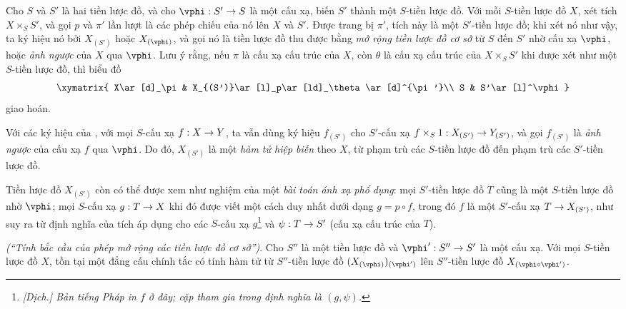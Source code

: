\documentclass[oneside]{amsart}
\makeatletter
\newcommand{\ega@arrow}[2]{\mathchoice{#1}{#2}{#2}{#2}}
\renewcommand{\to}{\ega@arrow{\longrightarrow}{\rightarrow}}
\let\EGAOriginalLabel\label
\renewcommand{\label}[1]{\phantomsection\EGAOriginalLabel{#1}}
\makeatother
\begin{document}
\begin{env}[3.3.6]
\label{I.3.3.6}
Cho $S$ và $S'$ là hai tiền lược đồ, và cho $\vphi:S'\to S$ là một cấu xạ,
biến $S'$ thành một $S$-tiền lược đồ. Với mỗi $S$-tiền lược đồ $X$, xét tích
$X\times_S S'$, và gọi $p$ và $\pi'$ lần lượt là các phép chiếu của nó lên $X$
và $S'$. Được trang bị $\pi'$, tích này là một $S'$-tiền lược đồ; khi xét nó
như vậy, ta ký hiệu nó bởi $X_{(S')}$ hoặc $X_{(\vphi)}$, và gọi nó là tiền
lược đồ thu được bằng \emph{mở rộng tiền lược đồ cơ sở} từ $S$ đến $S'$ nhờ
cấu xạ $\vphi$, hoặc \emph{ảnh ngược} của $X$ qua $\vphi$. Lưu ý rằng, nếu
$\pi$ là cấu xạ cấu trúc của $X$, còn $\theta$ là cấu xạ cấu trúc của
$X\times_S S'$ khi được xét như một $S$-tiền lược đồ, thì biểu đồ
\[
  \xymatrix{
    X\ar[d]_\pi &
    X_{(S')}\ar[l]_p\ar[ld]_\theta\ar[d]^{\pi'}\\
    S &
    S'\ar[l]^\vphi
  }
\]
giao hoán.
\end{env}

\begin{env}[3.3.7]
\label{I.3.3.7}
Với các ký hiệu của , với mọi $S$-cấu xạ $f:X\to Y$, ta vẫn
dùng ký hiệu $f_{(S')}$ cho $S'$-cấu xạ
$f\times_S 1:X_{(S')}\to Y_{(S')}$, và gọi
$f_{(S')}$ là \emph{ảnh ngược} của cấu xạ $f$ qua $\vphi$. Do đó,
$X_{(S')}$ là một \emph{hàm tử hiệp biến} theo $X$, từ phạm trù các
$S$-tiền lược đồ đến phạm trù các $S'$-tiền lược đồ.
\end{env}

\begin{env}[3.3.8]
\label{I.3.3.8}
Tiền lược đồ $X_{(S')}$ còn có thể được xem như nghiệm của một
\emph{bài toán ánh xạ phổ dụng}: mọi $S'$-tiền lược đồ $T$ cũng là một
$S$-tiền lược đồ nhờ $\vphi$; mọi $S$-cấu xạ $g:T\to X$ khi đó được viết một
cách duy nhất dưới dạng $g=p\circ f$, trong đó $f$ là một $S'$-cấu xạ
$T\to X_{(S')}$, như suy ra từ định nghĩa của tích áp dụng cho các $S$-cấu xạ
$g$\footnote{\emph{[Dịch.] Bản tiếng Pháp in $f$ ở đây; cặp tham gia trong
định nghĩa là $(g,\psi)$.}} và $\psi:T\to S'$ (cấu xạ cấu trúc của $T$).
\end{env}

\begin{proposition}[3.3.9]
\label{I.3.3.9}
\emph{(``Tính bắc cầu của phép mở rộng các tiền lược đồ cơ sở'')}. Cho $S''$
là một tiền lược đồ và $\vphi':S''\to S'$ là một cấu xạ. Với mọi
$S$-tiền lược đồ $X$, tồn tại một đẳng cấu chính tắc có tính hàm tử từ
$S''$-tiền lược đồ $(X_{(\vphi)})_{(\vphi')}$ lên $S''$-tiền lược đồ
$X_{(\vphi\circ\vphi')}$.
\end{proposition}
\end{document}
